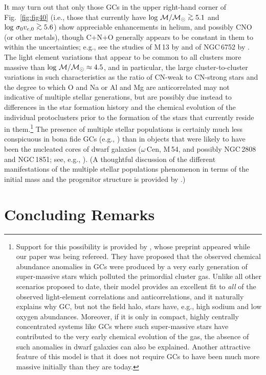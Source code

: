 \documentclass[12pt,preprint]{aastex}
\newcommand\msol{{\cal M_{\odot}}}
\newcommand\gta{\mathrel{\hbox{\raise 0.6 ex \hbox{$>$}\kern
                   -1.7 ex\lower .5 ex\hbox{$\sim$}}}}
\begin{document}
It may turn out that only those GCs in the upper right-hand corner of
Fig.~\ref{fig:fig40} (i.e., those that currently have $\log\,{\cal M}/\msol
\gta 5.1$ and $\log\,\sigma_0v_{e,0} \gta 5.6$) show appreciable enhancements
in helium, and possibly CNO (or other metals), though C$+$N$+$O generally
appears to be constant in them to within the uncertainties; e.g., see the
studies of M$\,$13 by \citet{cm05a} and of NGC$\,$6752 by \citet{cbg07}.  The
light element variations that appear to be common to all clusters more massive
than $\log\,{\cal M}/\msol \approx 4.5$, and in particular, the large
cluster-to-cluster variations in such characteristics as the ratio of CN-weak to
CN-strong stars and the degree to which O and Na or Al and Mg are anticorrelated 
may not indicative of multiple stellar generations, but are possibly due instead
to differences in the star formation history and the chemical evolution of the
individual protoclusters prior to the formation of the stars that currently
reside in them.\footnote{Support for this possibility is provided by
\citet{dh13}, whose preprint appeared while our paper was being refereed.
They have proposed that the observed chemical abundance anomalies in GCs were
produced by a very early generation of super-massive stars which polluted the
primordial cluster gas.  Unlike all other scenarios proposed to date, their
model provides an excellent fit to {\it all} of the observed light-element
correlations and anticorrelations, and it naturally explains why GC, but not
the field halo, stars have, e.g., high sodium and low oxygen abundances.
Moreover, if it is only in compact, highly centrally concentrated systems like
GCs where such super-massive stars have contributed to the very early chemical
evolution of the gas, the absence of such anomalies in dwarf galaxies can also
be explained.  Another attractive feature of this model is that it does not
require GCs to have been much more massive initially than they are today.}
The presence of multiple stellar populations is certainly much
less conspicuous in bona fide GCs (e.g., \citealt{pma12}) than in objects that
were likely to have been the nucleated cores of dwarf galaxies ($\omega\,$Cen,
M$\,$54, and possibly NGC$\,$2808 and NGC$\,$1851; see, e.g., \citealt{by12}).
(A thoughtful discussion of the different manifestations of the multiple
stellar populations phenomenon in terms of the initial mass and the progenitor
structure is provided by \citealt{vc11}.)

 
\section{Concluding Remarks}
\label{sec:final}
\end{document}
